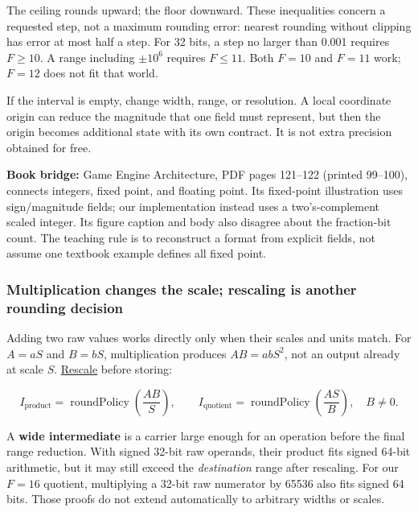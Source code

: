The ceiling rounds upward; the floor downward. These inequalities concern a requested step, not a maximum rounding error: nearest rounding without clipping has error at most half a step. For 32 bits, a step no larger than 0.001 requires \(F\ge10\). A range including \(\pm10^6\) requires \(F\le11\). Both \(F=10\) and \(F=11\) work; \(F=12\) does not fit that world.

If the interval is empty, change width, range, or resolution. A local coordinate origin can reduce the magnitude that one field must represent, but then the origin becomes additional state with its own contract. It is not extra precision obtained for free.

\textbf{Book bridge:} Game Engine Architecture, PDF pages 121--122 (printed 99--100), connects integers, fixed point, and floating point. Its fixed-point illustration uses sign/magnitude fields; our implementation instead uses a two's-complement scaled integer. Its figure caption and body also disagree about the fraction-bit count. The teaching rule is to reconstruct a format from explicit fields, not assume one textbook example defines all fixed point.

\subsubsection{Multiplication changes the scale; rescaling is another rounding decision}\label{01-foundations-i-ch001-multiplication-changes-the-scale-rescaling-is-another-rounding-decision}

\hypertarget{01-foundations-i-ch001-multiplication-changes-the-scale-rescaling-is-another-rounding-decision}{}

Adding two raw values works directly only when their scales and units match. For \(A=aS\) and \(B=bS\), multiplication produces \(AB=abS^2\), not an output already at scale \(S\). \hyperref[appendix-3333db47830f]{Rescale} before storing:

\[
I_{\mathrm{product}}=\operatorname{roundPolicy}\!\left(\frac{AB}{S}\right),
\qquad
I_{\mathrm{quotient}}=\operatorname{roundPolicy}\!\left(\frac{AS}{B}\right),\quad B\ne0.
\]

A \textbf{wide intermediate} is a carrier large enough for an operation before the final range reduction. With signed 32-bit raw operands, their product fits signed 64-bit arithmetic, but it may still exceed the \emph{destination} range after rescaling. For our \(F=16\) quotient, multiplying a 32-bit raw numerator by 65536 also fits signed 64 bits. Those proofs do not extend automatically to arbitrary widths or scales.

